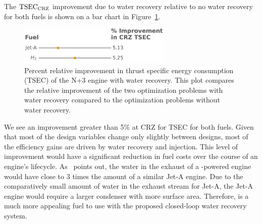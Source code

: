 \documentclass[conf]{new-aiaa}
\begin{document}
The $\rm{TSEC}_{\rm{CRZ}}$ improvement due to water recovery relative to no water recovery for both fuels is shown on a bar chart in Figure~\ref{fig:barchart}.

\begin{figure}[hbt!]
  \centering
  \includegraphics[width=0.65\textwidth]{bar_chart.pdf}
  \caption{Percent relative improvement in thrust specific energy consumption (TSEC) of the N+3 engine with water recovery.
    This plot compares the relative improvement of the two optimization problems with water recovery compared to the optimization problems without water recovery.}
  \label{fig:barchart}
\end{figure}

We see an improvement greater than 5\% at CRZ for TSEC for both fuels.
Given that most of the design variables change only slightly between designs, most of the efficiency gains are driven by water recovery and injection.
This level of improvement would have a significant reduction in fuel costs over the course of an engine's lifecycle.
As~\citeauthor{Strom2002} points out, the water in the exhaust of a -powered engine would have close to 3 times the amount of a similar Jet-A engine.
Due to the comparatively small amount of water in the exhaust stream for Jet-A, the Jet-A engine would require a larger condenser with more surface area.
Therefore,  is a much more appealing fuel to use with the proposed closed-loop water recovery system.
\end{document}
